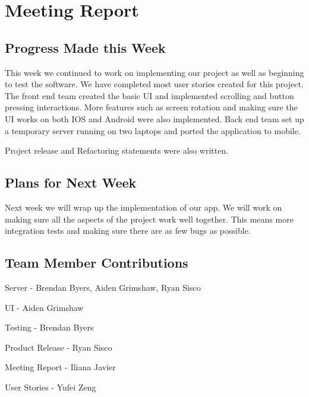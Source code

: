 \documentclass[12pt]{article}
\begin{document}
\section{Meeting Report}
\subsection{Progress Made this Week}

This week we continued to work on implementing our project as well as beginning 
to test the software. We have completed most user stories created for this 
project. The front end team created the basic UI and implemented scrolling and 
button pressing interactions. More features such as screen rotation and making 
sure the UI works on both IOS and Android were also implemented. Back end team 
set up a temporary server running on two laptops and ported the application to 
mobile.  

Project release and Refactoring statements were also written.  


\subsection{Plans for Next Week}

Next week we will wrap up the implementation of our app.  We will work on making
sure all the aspects of the project work well together.  This means more integration
tests and making sure there are as few bugs as possible.

\subsection{Team Member Contributions}

Server - Brendan Byers, Aiden Grimshaw, Ryan Sisco

UI  - Aiden Grimshaw

Testing - Brendan Byers

Product Release - Ryan Sisco

Meeting Report - Iliana Javier

User Stories - Yufei Zeng
\end{document}
